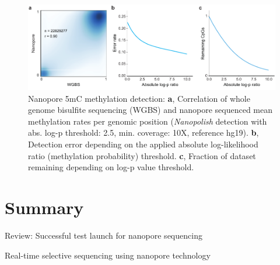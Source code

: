 \begin{figure}[h]
    \centering
    \includegraphics[width=1.0\textwidth]{figures/state_of_art/methylation.pdf}
    \captionsetup{format=plain}
    \caption[Nanopore methylation detection]{Nanopore 5mC methylation detection: \textbf{a}, Correlation of whole genome bisulfite sequencing (WGBS) and nanopore sequenced mean methylation rates per genomic position (\textit{Nanopolish} detection with abs. log-p threshold: 2.5, min. coverage: 10X, reference hg19). \textbf{b}, Detection error depending on the applied absolute log-likelihood ratio (methylation probability) threshold. \textbf{c}, Fraction of dataset remaining depending on log-p value threshold.}
    \label{fig:state_of_art:methylation}
\end{figure}




\section{Summary}
\label{sec:stat_of_art:summary}


Review: Successful test launch for nanopore sequencing \cite{Loman2015a}

Real-time selective sequencing using nanopore technology \cite{Loose2016}	







